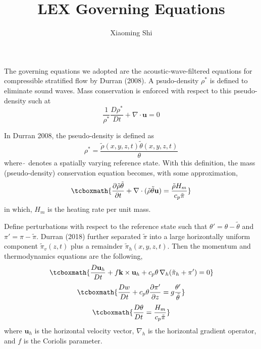 \documentclass[a4paper,11pt]{article}
\title{\textbf{LEX Governing Equations}}
\author{Xiaoming Shi}
\begin{document}
\maketitle

The governing equations we adopted are the acoustic-wave-filtered equations for compressible stratified flow by Durran (2008). A psudo-density $\rho^*$ is defined to eliminate sound waves. Mass conservation is enforced with respect to this pseudo-density such at
\begin{equation}
 \frac{1}{\rho^*} \frac{D \rho^*}{D t} + \nabla\cdot \mathbf{u} = 0 \nonumber
\end{equation}

In Durran 2008, the pseudo-density is defined as 
\begin{equation}
 \rho^* = \frac{\tilde{\rho}(x,y,z,t)\tilde{\theta}(x,y,z,t)}{\theta} \nonumber 
\end{equation}
where $\tilde{\ }$ denotes a spatially varying reference state. With this definition, the mass (pseudo-density) conservation equation becomes, with some approximation,
\begin{equation}
\tcboxmath{
\frac{\partial \tilde{\rho} \tilde{\theta}}{\partial t} + \nabla\cdot (\tilde{\rho}\tilde{\theta}\mathbf{u}) = \frac{\tilde{\rho} H_m}{c_p \tilde{\pi}}
}
\end{equation}
in which, $H_m$ is the heating rate per unit mass. 

Define perturbations with respect to the reference state such that $\theta' = \theta - \tilde{\theta}$ and $\pi' = \pi - \tilde{\pi}$. Durran (2018) further separated $\tilde{\pi}$ into a large horizontally uniform component $\tilde{\pi}_v(z,t)$ plus a remainder $\tilde{\pi}_h(x,y,z,t)$. Then the momentum and thermodynamics equations are the following,
\begin{equation}
\tcboxmath{
\frac{D \mathbf{u}_h}{D t}  + f {\mathbf{k}} \times \mathbf{u}_h +  c_p \theta\,\nabla_h(\tilde{\pi}_h + \pi') = 0
}
\end{equation}
\begin{equation}
 \tcboxmath{
 \frac{D w}{D t} + c_p \theta \frac{\partial \pi'}{\partial z} = g\frac{\theta'}{\tilde{\theta}}
 }
\end{equation}
\begin{equation}
\tcboxmath{
 \frac{D \theta }{D t} = \frac{H_m}{c_p \tilde{\pi}}
 }
\end{equation}
where $\mathbf{u}_h$ is the horizontal velocity vector, $\nabla_h$ is the horizontal gradient operator, and $f$ is the Coriolis parameter. 
\end{document}
